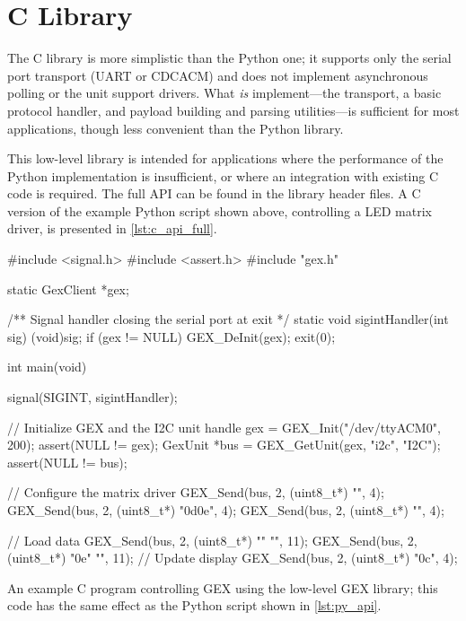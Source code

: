 \section{C Library}

The C library is more simplistic than the Python one; it supports only the serial port transport (\gls{UART} or \gls{CDCACM}) and does not implement asynchronous polling or the unit support drivers. What \textit{is} implement---the transport, a basic protocol handler, and payload building and parsing utilities---is sufficient for most applications, though less convenient than the Python library.

This low-level library is intended for applications where the performance of the Python implementation is insufficient, or where an integration with existing C code is required. The full \gls{API} can be found in the library header files. A C version of the example Python script shown above, controlling a \gls{LED} matrix driver, is presented in \cref{lst:c_api_full}.

\begin{listing}
	\begin{ccode}
	#include <signal.h>
	#include <assert.h>
	#include "gex.h"
	
	static GexClient *gex;
	
	/** Signal handler closing the serial port at exit */
	static void sigintHandler(int sig)
	{
	    (void)sig;
	    if (gex != NULL) GEX_DeInit(gex);
	    exit(0);
	}
	
	int main(void)
	{
	    signal(SIGINT, sigintHandler);
	    
	    // Initialize GEX and the I2C unit handle
	    gex = GEX_Init("/dev/ttyACM0", 200);
	    assert(NULL != gex);        
	    GexUnit *bus = GEX_GetUnit(gex, "i2c", "I2C");
	    assert(NULL != bus);
	    	    
	    // Configure the matrix driver
	    GEX_Send(bus, 2, (uint8_t*) "\x00", 4);
	    GEX_Send(bus, 2, (uint8_t*) "\x0d\x0e", 4);
	    GEX_Send(bus, 2, (uint8_t*) "", 4);
	    
	    // Load data
	    GEX_Send(bus, 2, (uint8_t*) ""
	                                "\xAA{}\xAA{}\xAA{}\xAA{}", 11);
	    GEX_Send(bus, 2, (uint8_t*) "\x0e"
	                                "\xFF{}\xFF{}\xFF{}\xFF{}", 11);
	    // Update display
	    GEX_Send(bus, 2, (uint8_t*) "\x0c", 4);
	}    
	\end{ccode}
	\caption{\label{lst:c_api_full} An example C program controlling GEX using the low-level GEX library; this code has the same effect as the Python script shown in \cref{lst:py_api}.}
\end{listing}

